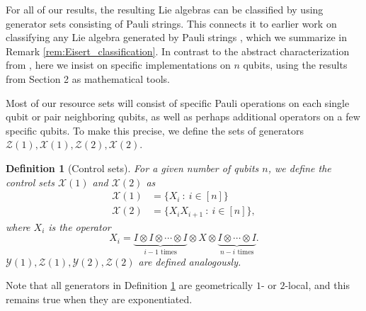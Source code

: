 \documentclass[12pt, a4-paper]{amsart}
\newcommand{\cX}{\mathcal{X}}
\newcommand{\cY}{\mathcal{Y}}
\newcommand{\cZ}{\mathcal{Z}}
\numberwithin{equation}{section}
\newtheorem{defi}[lemma]{Definition}
\begin{document}
For all of our results, the resulting Lie algebras can be classified by using generator sets consisting of Pauli strings. This connects it to earlier work on classifying any Lie algebra generated by Pauli strings \cite{Aguilar2024FullClassificationLie}, which we summarize in Remark \ref{rem:Eisert_classification}. In contrast to the abstract characterization from \cite{Aguilar2024FullClassificationLie}, here we insist on specific implementations on $n$ qubits, using the results from Section 2 as mathematical tools.

Most of our resource sets will consist of specific Pauli operations on each single qubit or pair neighboring qubits, as well as perhaps additional operators on a few specific qubits. To make this precise, we define the sets of generators $\cZ(1), \cX(1), \cZ(2), \cX(2)$.
\begin{defi}[Control sets]\label{def:control_sets}
    For a given number of qubits $n$, we define the control sets $\cX(1)$ and $\cX(2)$ as
    \begin{align*}
        \cX(1) &= \{X_i ~:~ i \in [n]\} \\
        \cX(2) &= \{X_i X_{i+1} ~:~ i \in [n] \},
    \end{align*}
    where $X_i$ is the operator
    \begin{equation}
        X_i = \underbrace{I \otimes I \otimes \cdots \otimes I}_{i-1 \text{ times} }\otimes X \otimes \underbrace{I \otimes \cdots \otimes I}_{n -i \text{ times}}.
    \end{equation}
    $\cY(1), \cZ(1), \cY(2), \cZ(2)$ are defined analogously.
\end{defi}
Note that all generators in Definition \ref{def:control_sets} are geometrically $1$- or $2$-local, and this remains true when they are exponentiated.
\end{document}
